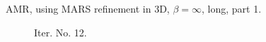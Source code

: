 \documentclass[a4paper,12pt]{amsart}
\numberwithin{equation}{section}
\begin{document}
\begin{figure}[h!]
\caption{AMR, using MARS refinement in 3D, $\beta = \infty$, long, part 1.}
\label{fig:amr_trans3D_paraview_mars_longrun_part1}
\end{figure}

\begin{figure}[h!]
\centering
\begin{subfigure}[t]{0.49\textwidth}
    \caption{Iter. No. 12.}
\end{subfigure}
	\hfill
\begin{subfigure}[t]{0.49\textwidth}

\end{subfigure}
\end{figure}
\end{document}
